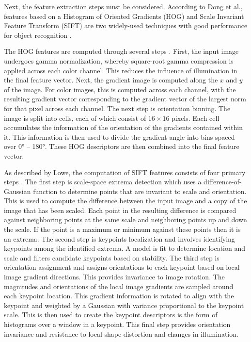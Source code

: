 \documentclass[letterpaper, 10 pt, conference]{conf/ieeeconf}  %
\begin{document}
Next, the feature extraction steps must be considered. According to Dong et al.,
features based on a Histogram of Oriented Gradients (HOG) and Scale Invariant
Feature Transform (SIFT) are two widely-used techniques with good performance
for object recognition \cite{Dong2010}.

The HOG features are computed through several steps \cite{Dalal2005}. First, the
input image undergoes gamma normalization, whereby square-root gamma compression
is applied across each color channel. This reduces the influence of illumination
in the final feature vector. Next, the gradient image is computed along the $x$
and $y$ of the image. For color images, this is computed across each channel,
with the resulting gradient vector corresponding to the gradient vector of the
largest norm for that pixel across each channel. The next step is orientation
binning. The image is split into cells, each of which consist of $16 \times 16$
pixels. Each cell accumulates the information of the orientation of the
gradients contained within it. This information is then used to divide the
gradient angle into bins spaced over \ang{0} -- \ang{180}. These HOG descriptors
are then combined into the final feature vector.

As described by Lowe, the computation of SIFT features consists of four primary
steps \cite{Lowe2004}. The first step is scale-space extrema detection which
uses a difference-of-Gaussian function to determine points that are invariant to
scale and orientation. This is used to compute the difference between the input
image and a copy of the image that has been scaled. Each point in the resulting
difference is compared against neighboring points at the same scale and
neighboring points up and down the scale. If the point is a maximum or minimum
against these points then it is an extrema. The second step is keypoints
localization and involves identifying keypoints among the identified extrema. A
model is fit to determine location and scale and filters candidate keypoints
based on stability. The third step is orientation assignment and assigns
orientations to each keypoint based on local image gradient directions. This
provides invariance to image rotation. The magnitudes and orientations of the
local image gradients are sampled around each keypoint location. This gradient
information is rotated to align with the keypoint and weighted by a Gaussian
with variance proportional to the keypoint scale. This is then used to create
the keypoint descriptors is the form of histograms over a window in a keypoint.
This final step provides orientation invariance and resistance to local shape
distortion and changes in illumination.
\end{document}
